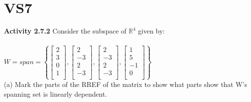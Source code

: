 \documentclass{article}
\begin{document}
{\section{VS7}
\textbf{Activity 2.7.2} Consider the subspace of $\mathbb{R}^{4}$ given by:\\
\\
$
W = span =  
\left\{ 
\begin{bmatrix} 
2\\ 3\\ 0\\ 1\\
\end{bmatrix},
\begin{bmatrix} 
2\\ -3\\ 2\\-3\\ 
\end{bmatrix},
\begin{bmatrix} 
2\\ -3\\ 2\\ -3\\
\end{bmatrix},
\begin{bmatrix} 
1\\ 5\\ -1\\ 0\\
\end{bmatrix} 
\right\}$
\\

(a) Mark the parts of the RREF of the matrix to show what parts show that W's spanning set is linearly dependent.

}
\end{document}
